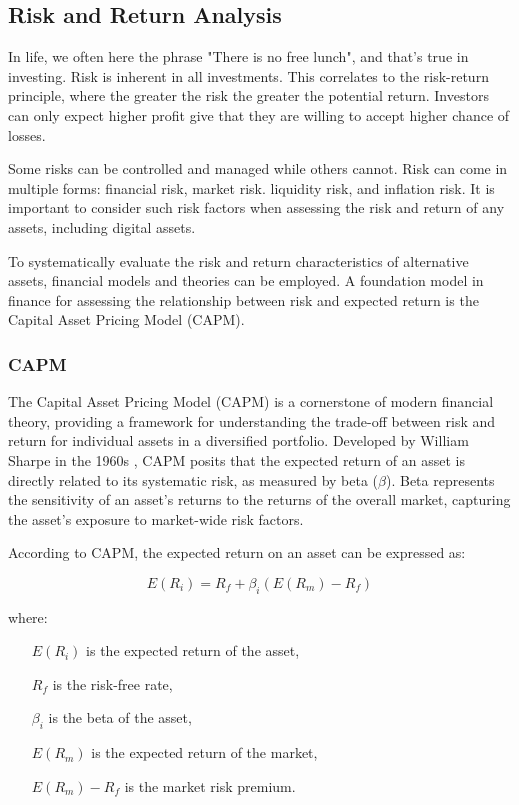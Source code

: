 \subsection{Risk and Return Analysis}

In life, we often here the phrase "There is no free lunch", and that's true in investing. Risk is inherent in all investments. This correlates to the risk-return principle, where the greater the risk the greater the potential return. Investors can only expect higher profit give that they are willing to accept higher chance of losses.

Some risks can be controlled and managed while others cannot. Risk can come in multiple forms: financial risk, market risk. liquidity risk, and inflation risk.  It is important to consider such risk factors when assessing the risk and return of any assets, including digital assets. 

To systematically evaluate the risk and return characteristics of alternative assets, financial models and theories can be employed. A foundation model in finance for assessing the relationship between risk and expected return is the Capital Asset Pricing Model (CAPM).

\subsubsection{CAPM}
The Capital Asset Pricing Model (CAPM) is a cornerstone of modern financial theory, providing a framework for understanding the trade-off between risk and return for individual assets in a diversified portfolio. Developed by William Sharpe in the 1960s \cite{Sharpe1964}, CAPM posits that the expected return of an asset is directly related to its systematic risk, as measured by beta (\(\beta\)). Beta represents the sensitivity of an asset's returns to the returns of the overall market, capturing the asset's exposure to market-wide risk factors.

According to CAPM, the expected return on an asset can be expressed as:

\begin{equation}\label{eq:CAPM}
E(R_i) = R_f + \beta_i (E(R_m) - R_f)
\end{equation}


where:
\begin{itemize}
    \item[$E(R_i)$] is the expected return of the asset,
    \item[$R_f$] is the risk-free rate,
    \item[$\beta_i$] is the beta of the asset,
    \item[$E(R_m)$] is the expected return of the market,
    \item[$E(R_m) - R_f$] is the market risk premium.
\end{itemize}

